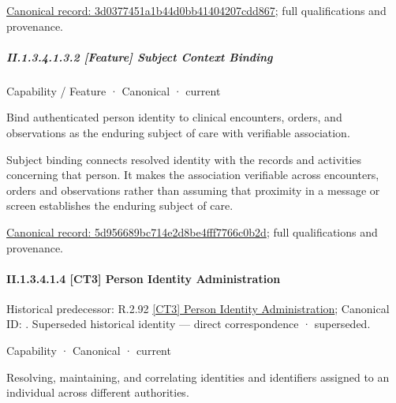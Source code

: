 {\footnotesize \href{../../../../../../../continuum/strategy/capability/feature/3d0377451a1b44d0bb41404207cdd867.md}{Canonical record: 3d0377451a1b44d0bb41404207cdd867}; full qualifications and provenance.}\par
\subparagraph*{II.1.3.4.1.3.2 [Feature] Subject Context Binding}
\label{navigation:II.1.3.4.1.3.2}

\label{element:5d956689bc714e2d8be4fff7766c0b2d}
{\small Capability / Feature · Canonical · current}\par

Bind authenticated person identity to clinical encounters, orders, and observations as the enduring subject of care with verifiable association.



Subject binding connects resolved identity with the records and activities concerning that person. It makes the association verifiable across encounters, orders and observations rather than assuming that proximity in a message or screen establishes the enduring subject of care.


{\footnotesize \href{../../../../../../../continuum/strategy/capability/feature/5d956689bc714e2d8be4fff7766c0b2d.md}{Canonical record: 5d956689bc714e2d8be4fff7766c0b2d}; full qualifications and provenance.}\par
\paragraph*{II.1.3.4.1.4 [CT3] Person Identity Administration}
\label{navigation:II.1.3.4.1.4}

{\small Historical predecessor: R.2.92 \hyperref[element:7550fd5b17e643118fa76d2616e1ba20]{[CT3] Person Identity Administration}; Canonical ID: \texttt{}. Superseded historical identity — direct correspondence · superseded.}\par
\label{element:6c3de7750ef1436cad6a9533731782b6}
{\small Capability · Canonical · current}\par

Resolving, maintaining, and correlating identities and identifiers assigned to an individual across different authorities.



